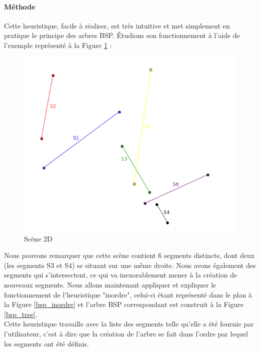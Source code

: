 \documentclass[11pt,a4paper]{article}
\begin{document}
\paragraph{Méthode}

Cette heuristique, facile à réaliser, est très intuitive et met simplement en pratique le principe des arbres BSP. Étudions son fonctionnement à l'aide de l'exemple représenté à la Figure \ref{scene_inordre} : 

\begin{figure}[!h]
\centering
\includegraphics[scale=0.6]{bsp_ex_1.png}
\caption{Scène 2D}
\label{scene_inordre}
\end{figure}

Nous pouvons remarquer que cette scène contient 6 segments distincts, dont deux (les segments S3 et S4) se situant sur une même droite. Nous avons également des segments qui s'intersectent, ce qui va inexorablement mener à la création de nouveaux segments. Nous allons maintenant appliquer et expliquer le fonctionnement de l'heuristique "inordre", celui-ci étant représenté dans le plan à la Figure \ref{bsp_inordre} et l'arbre BSP correspondant est construit à la Figure \ref{bsp_tree}. \\

Cette heuristique travaille avec la liste des segments telle qu'elle a été fournie par l'utilisateur, c'est à dire que la création de l'arbre se fait dans l'ordre par lequel les segments ont été définis. \\
\end{document}
